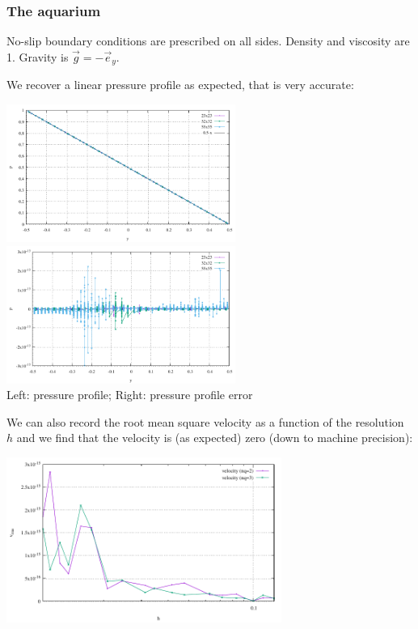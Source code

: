 \subsubsection*{The aquarium}

No-slip boundary conditions are prescribed on all sides. Density and viscosity are 1.
Gravity is $\vec{g}=-\vec{e}_y$. 

We recover a linear pressure profile as expected, that is very accurate:

\begin{center}
\includegraphics[width=7.5cm]{python_codes/fieldstone_80/results/aquarium/p}
\includegraphics[width=7.5cm]{python_codes/fieldstone_80/results/aquarium/p_error}\\
{\captionfont Left: pressure profile; Right: pressure profile error}
\end{center}

We can also record the root mean square velocity as a function of the resolution $h$
and we find that the velocity is (as expected) zero (down to machine precision):
\begin{center}
\includegraphics[width=9cm]{python_codes/fieldstone_80/results/aquarium/vrms}
\end{center}


